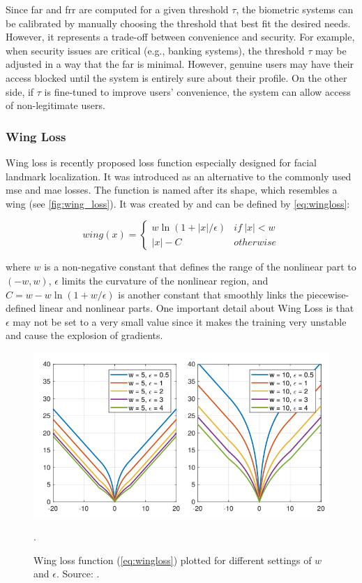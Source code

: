 Since \acs{far} and \acs{frr} are computed for a given threshold $\tau$, the biometric systems can be calibrated by manually choosing the threshold that best fit the desired needs. However, it represents a trade-off between convenience and security. For example, when security issues are critical (e.g., banking systems), the threshold $\tau$ may be adjusted in a way that the \acs{far} is minimal. However, genuine users may have their access blocked until the system is entirely sure about their profile. On the other side, if $\tau$ is fine-tuned to improve users' convenience, the system can allow access of non-legitimate users.

\subsubsection{Wing Loss} \label{sec:wingloss}

Wing loss is recently proposed loss function especially designed for facial landmark localization. It was introduced as an alternative to the commonly used \acs{mse} and \acs{mae} losses. The function is named after its shape, which resembles a wing (see \autoref{fig:wing_loss}). It was created by \citep{wingloss} and can be defined by \autoref{eq:wingloss}: 

\begin{equation}
\label{eq:wingloss}
wing(x) = \begin{cases}
w\ln(1 + \left | x \right | / \epsilon) & if\ \left | x \right | < w\\ 
\left | x \right | - C & otherwise 
\end{cases}
\end{equation}

\noindent
where $w$ is a non-negative constant that defines the range of the nonlinear part to $(-w, w)$, $\epsilon$ limits the curvature of the nonlinear region, and $C = w - w\ln(1 + w / \epsilon)$ is another constant that smoothly links the piecewise-defined linear and nonlinear parts. One important detail about Wing Loss is that $\epsilon$ may not be set to a very small value since it makes the training very unstable and cause the explosion of gradients.

\begin{figure}[htb]
\centering
\includegraphics[width=0.8\linewidth]{images/metrics/wing_loss.png}
\caption{Wing loss function (\autoref{eq:wingloss}) plotted for different settings of $w$ and $\epsilon$. Source: \citep{wingloss}.}.
\label{fig:wing_loss}
\end{figure}

